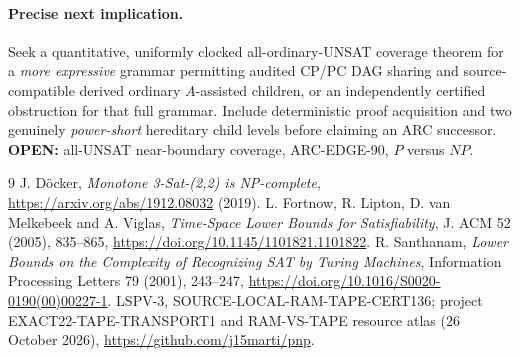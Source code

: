 \documentclass[11pt]{article}
\begin{document}
\paragraph{Precise next implication.}
Seek a quantitative, uniformly clocked all-ordinary-UNSAT
coverage theorem for a \emph{more expressive} grammar permitting
audited CP/PC DAG sharing and source-compatible derived ordinary
$A$-assisted children, or an independently certified obstruction
for that full grammar. Include deterministic proof acquisition
and two genuinely \emph{power-short} hereditary child levels
before claiming an ARC successor.
\textbf{OPEN:} all-UNSAT near-boundary coverage, ARC-EDGE-90, $P$ versus $NP$.

\begin{thebibliography}{9}
J. D\"ocker, \emph{Monotone 3-Sat-(2,2) is NP-complete},
\url{https://arxiv.org/abs/1912.08032} (2019).
L. Fortnow, R. Lipton, D. van Melkebeek and A. Viglas,
\emph{Time-Space Lower Bounds for Satisfiability},
J. ACM 52 (2005), 835--865,
\url{https://doi.org/10.1145/1101821.1101822}.
R. Santhanam, \emph{Lower Bounds on the Complexity of Recognizing SAT
by Turing Machines}, Information Processing Letters 79 (2001),
243--247, \url{https://doi.org/10.1016/S0020-0190(00)00227-1}.
LSPV-3, SOURCE-LOCAL-RAM-TAPE-CERT136;
project EXACT22-TAPE-TRANSPORT1 and RAM-VS-TAPE resource atlas
(26 October 2026), \url{https://github.com/j15marti/pnp}.
\end{thebibliography}
\end{document}
